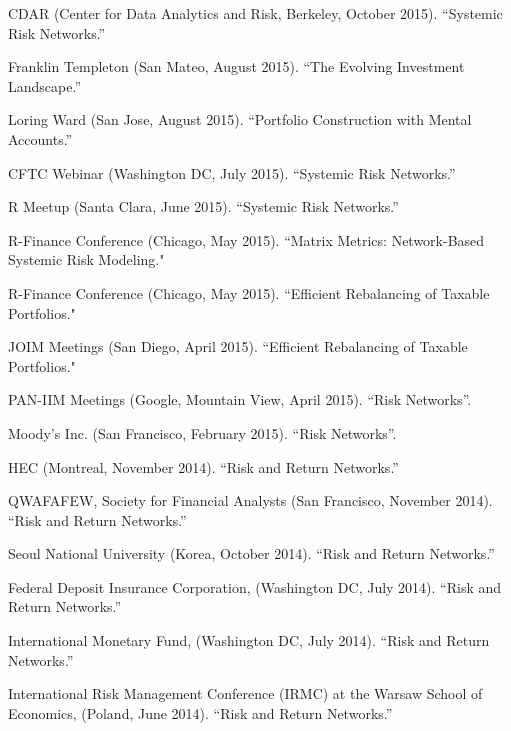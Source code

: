 \documentclass{article}
\begin{document}
\begin{etaremune}
{\item CDAR (Center for Data Analytics and Risk, Berkeley, October 2015). ``Systemic Risk Networks.''

\item Franklin Templeton (San Mateo, August 2015). ``The Evolving Investment Landscape.''

\item Loring Ward (San Jose, August 2015). ``Portfolio Construction with Mental Accounts.''

\item CFTC Webinar (Washington DC, July 2015). ``Systemic Risk Networks.''

\item R Meetup (Santa Clara, June 2015). ``Systemic Risk Networks.''

\item R-Finance Conference (Chicago, May 2015). ``Matrix Metrics: Network-Based Systemic Risk Modeling."

\item R-Finance Conference (Chicago, May 2015). ``Efficient Rebalancing of Taxable Portfolios."

\item JOIM Meetings (San Diego, April 2015). ``Efficient Rebalancing of Taxable Portfolios."

\item PAN-IIM Meetings  (Google, Mountain View, April 2015). ``Risk Networks''.

\item Moody's Inc.  (San Francisco, February 2015). ``Risk Networks''.

\item HEC (Montreal, November 2014). ``Risk and Return Networks.''

\item QWAFAFEW, Society for Financial Analysts (San Francisco, November 2014). ``Risk and Return Networks.''

\item Seoul National University (Korea, October 2014). ``Risk and Return Networks.''

\item Federal Deposit Insurance Corporation, (Washington DC, July 2014). ``Risk and Return Networks.''

\item International Monetary Fund, (Washington DC, July 2014). ``Risk and Return Networks.''

\item International Risk Management Conference (IRMC) at the Warsaw School of Economics, (Poland, June 2014). ``Risk and Return Networks.''

}
\end{etaremune}
\end{document}
